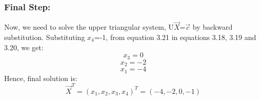 \documentclass[12pt, oneside,table]{report}
\newcommand{\?}{\stackrel{?}{=}}
\theoremstyle{definition}
\begin{document}
\subsubsection{Final Step:}
Now, we need to solve the upper triangular system, U$\overrightarrow{X}$=$\overrightarrow{c}$ by backward substitution.
Substituting $x_{4}$=-1, from equation 3.21 in equations 3.18, 3.19 and 3.20, we get:
\begin{equation}
   x_{3}=0 
\end{equation}
\begin{equation}
    x_{2}=-2
\end{equation}
\begin{equation}
    x_{1}=-4
\end{equation}
Hence, final solution is:
\begin{equation}
    \overrightarrow{X}^{T}=\left(x_{1},x_{2},x_{3},x_{4}\right)^{T}=\left(-4,-2,0,-1\right)
\end{equation}
\end{document}
